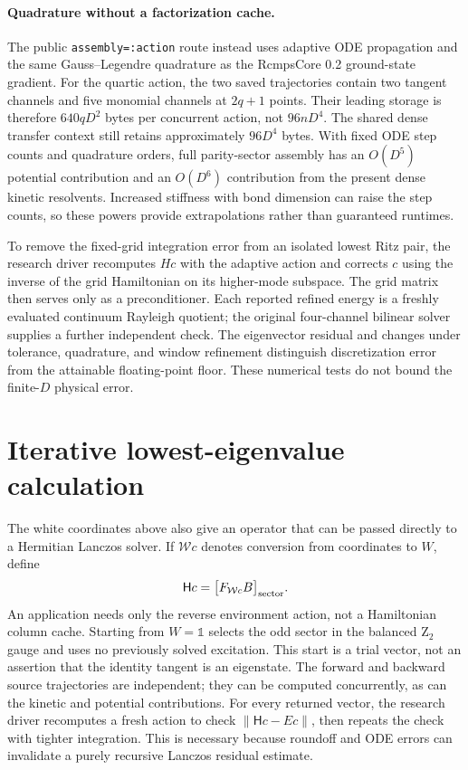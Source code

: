 \documentclass[11pt]{article}
\newcommand{\Id}{\mathbb{1}}
\begin{document}
\paragraph{Quadrature without a factorization cache.}
The public \texttt{assembly=:action} route instead uses adaptive ODE
propagation and the same Gauss--Legendre quadrature as the RcmpsCore 0.2 ground-state
gradient. For the quartic action, the two saved trajectories contain two
tangent channels and five monomial channels at $2q+1$ points. Their leading
storage is therefore $640qD^2$ bytes per concurrent action, not $96nD^4$.
The shared dense transfer context still retains approximately $96D^4$ bytes.
With fixed ODE step counts and quadrature orders, full parity-sector
assembly has an $O(D^5)$ potential contribution and an $O(D^6)$ contribution
from the present dense kinetic resolvents. Increased stiffness with bond
dimension can raise the step counts, so these powers provide extrapolations
rather than guaranteed runtimes.

To remove the fixed-grid integration error from an isolated lowest Ritz
pair, the research driver recomputes $Hc$ with the adaptive action and
corrects $c$ using the inverse of the grid Hamiltonian on its higher-mode
subspace. The grid matrix then serves only as a preconditioner. Each reported
refined energy is a freshly evaluated continuum Rayleigh quotient; the
original four-channel bilinear solver supplies a further independent check.
The eigenvector residual and changes under tolerance, quadrature, and window
refinement distinguish discretization error from the attainable floating-point
floor. These numerical tests do not bound the finite-$D$ physical error.

\section{Iterative lowest-eigenvalue calculation}
The white coordinates above also give an operator that can be passed directly
to a Hermitian Lanczos solver. If $\mathcal W c$ denotes conversion from
coordinates to $W$, define
\begin{equation}
 \mathsf Hc=\bigl[F_{\mathcal Wc}B\bigr]_{\rm sector}.
\end{equation}
An application needs only the reverse environment action, not a Hamiltonian
column cache. Starting from $W=\Id$ selects the odd sector in the balanced
Z$_2$ gauge and uses no previously solved excitation. This start is a trial
vector, not an assertion that the identity tangent is an eigenstate.
The forward and backward source trajectories are independent; they can be
computed concurrently, as can the kinetic and potential contributions.
For every returned vector, the research driver recomputes a fresh action to
check $\|\mathsf Hc-Ec\|$, then repeats the check with tighter integration.
This is necessary because roundoff and ODE errors can invalidate a purely
recursive Lanczos residual estimate.
\end{document}
